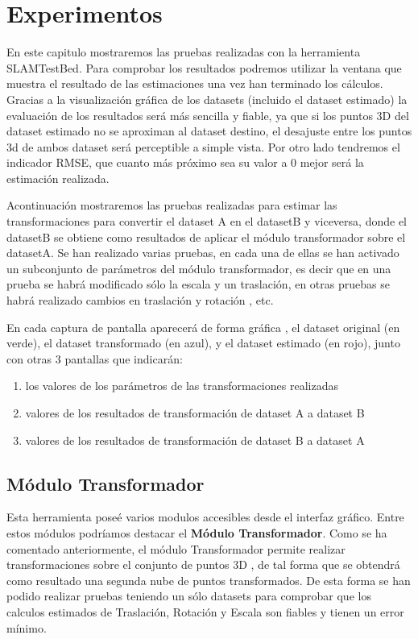 \newpage
\chapter{Experimentos} \label{cap:experimentos}
En este capitulo mostraremos las pruebas realizadas con la herramienta SLAMTestBed.
Para comprobar los resultados podremos utilizar la ventana que muestra el resultado de las estimaciones una vez han terminado los cálculos. Gracias a la visualización gráfica de los datasets (incluido el dataset estimado) la evaluación de los resultados será más sencilla y fiable, ya que si los puntos 3D del dataset estimado no se aproximan al dataset destino, el desajuste entre los puntos 3d de ambos dataset será perceptible a simple vista. 
Por otro lado tendremos el indicador RMSE, que cuanto más próximo sea su valor a 0 mejor será la estimación realizada.


Acontinuación mostraremos las pruebas realizadas para estimar las transformaciones para convertir el dataset A en el datasetB y viceversa, donde el datasetB se obtiene como resultados de aplicar el módulo transformador sobre el datasetA.
Se han realizado varias pruebas, en cada una de ellas se han activado un subconjunto de parámetros del módulo transformador, es decir que en una prueba se habrá modificado sólo la escala y un traslación, en otras pruebas se habrá realizado cambios en traslación y rotación , etc.

En cada captura de pantalla aparecerá de forma gráfica , el dataset original (en verde), el dataset transformado (en azul), y el dataset estimado (en rojo), junto con otras 3 pantallas que indicarán:
\begin{enumerate}
 \item{los valores de los parámetros de las transformaciones realizadas} 
 \item{valores de los resultados de transformación de dataset A a dataset B}
 \item{valores de los resultados de transformación de dataset B a dataset A}
\end{enumerate}

 
\section{Módulo Transformador}
Esta herramienta poseé varios modulos accesibles desde el interfaz gráfico. Entre estos módulos podríamos destacar el \textbf{Módulo Transformador}.
Como se ha comentado anteriormente, el módulo Transformador permite realizar transformaciones sobre el conjunto de puntos 3D , de tal forma que se obtendrá como resultado una segunda nube de puntos transformados. De esta forma se han podido realizar pruebas teniendo un sólo datasets para comprobar que los calculos estimados de Traslación, Rotación y Escala son fiables y tienen un error mínimo.

